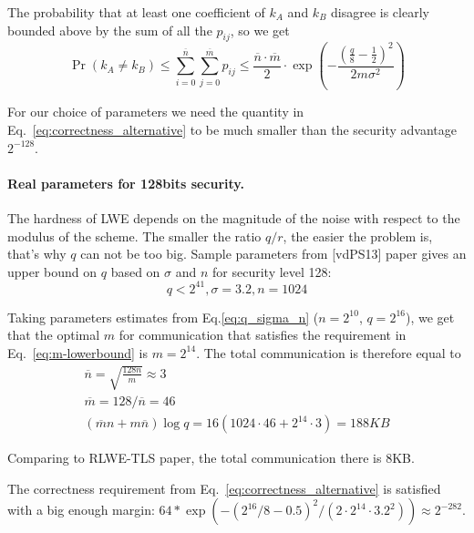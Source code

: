\documentclass[12pt]{article}
\newcommand{\nbar}{\overline{n}}
\newcommand{\mbar}{\overline{m}}
\begin{document}
The probability that at least one coefficient of $k_A$ and $k_B$ disagree is clearly bounded above by the sum of all the $p_{ij}$, so we get
\begin{equation}
\Pr(k_A \neq k_B) \leq \sum_{i = 0}^{\nbar} \sum_{j = 0}^{\mbar} p_{ij} \leq \frac{\nbar \cdot \mbar}{2}\cdot \exp\left(-\frac{\left(\frac{q}{8} - \frac{1}{2}\right)^2}{2m\sigma^2}\right)
\label{eq:correctness_alternative}
\end{equation}

For our choice of parameters we need the quantity in Eq.~\ref{eq:correctness_alternative} to be much smaller than the security advantage $2^{-128}$.

\paragraph{Real parameters for 128bits security.}
 The hardness of LWE depends on the magnitude of the noise with respect to the modulus of the scheme. The smaller the ratio $q / r$, the easier the problem is, that's why $q$ can not be too big. Sample parameters from [vdPS13] paper gives an upper bound on $q$ based on $\sigma$ and $n$ for security level 128:
\begin{equation}
q < 2^{41}, \sigma = 3.2, n = 1024
\label{eq:q_sigma_n}
\end{equation}

Taking parameters estimates from Eq.\ref{eq:q_sigma_n} ($n = 2^{10}$, $q = 2^{16}$), we get that the optimal $m$ for communication that satisfies the requirement in Eq.~\ref{eq:m-lowerbound} is $m = 2^{14}$. The total communication is therefore equal to
\begin{align}
\nbar = \sqrt{\frac{128n}{m}} \approx 3\\
\mbar = 128 / \nbar = 46\\
(\mbar n + m \nbar) \log q = 16 (1024 \cdot 46 + 2^{14} \cdot 3) = 188 KB
\end{align}

\begin{comment}
Unfortunately for these parameters the correctness from Eq.~\ref{eq:correctness_} requirement is not satisfied, we get: $16067 > 2^{-128}$.
\end{comment}

Comparing to RLWE-TLS paper, the total communication there is 8KB.

The correctness requirement from Eq.~\ref{eq:correctness_alternative} is satisfied with a big enough margin: $64 * \exp(-(2^{16} / 8 - 0.5)^2 / (2 \cdot 2^{14} \cdot 3.2^2)) \approx 2^{-282}$.
\end{document}
